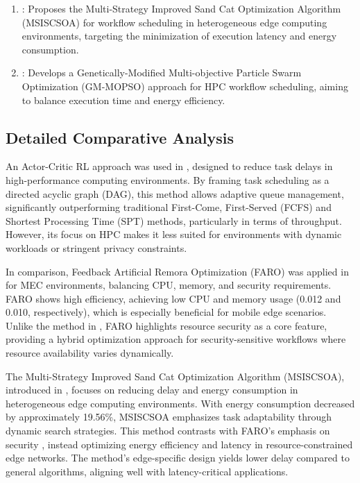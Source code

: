\documentclass[a4paper, final]{article}
\begin{document}
\begin{enumerate}
\item \cite{bib:3_sandcat}: Proposes the Multi-Strategy Improved Sand Cat Optimization Algorithm 
(MSISCSOA) for workflow scheduling in heterogeneous edge computing environments, targeting the 
minimization of execution latency and energy consumption.

\item  \cite{bib:10}: Develops a Genetically-Modified Multi-objective Particle Swarm Optimization 
(GM-MOPSO) approach for HPC workflow scheduling, aiming to balance execution time and energy efficiency.
\end{enumerate}

\subsection{Detailed Comparative Analysis}
An Actor-Critic RL approach was used in \cite{bib:1_acrl}, designed to reduce task delays in high-performance 
computing environments. By framing task scheduling as a directed acyclic graph (DAG), this method allows 
adaptive queue management, significantly outperforming traditional First-Come, First-Served (FCFS) and 
Shortest Processing Time (SPT) methods, particularly in terms of throughput. However, its focus on HPC makes 
it less suited for environments with dynamic workloads or stringent privacy constraints.

In comparison, Feedback Artificial Remora Optimization (FARO) was applied in \cite{bib:2_faro} for MEC 
environments, balancing CPU, memory, and security requirements. FARO shows high efficiency, achieving low 
CPU and memory usage (0.012 and 0.010, respectively), which is especially beneficial for mobile edge scenarios.
Unlike the method in \cite{bib:1_acrl}, FARO highlights resource security as a core feature, providing a 
hybrid optimization approach for security-sensitive workflows where resource availability varies dynamically.

The Multi-Strategy Improved Sand Cat Optimization Algorithm (MSISCSOA), introduced in \cite{bib:3_sandcat}, 
focuses on reducing delay and energy consumption in heterogeneous edge computing environments. With energy 
consumption decreased by approximately 19.56\%, MSISCSOA emphasizes task adaptability through dynamic search 
strategies. This method contrasts with FARO’s emphasis on security \cite{bib:2_faro}, instead optimizing 
energy efficiency and latency in resource-constrained edge networks. The method’s edge-specific design yields 
lower delay compared to general algorithms, aligning well with latency-critical applications.
\end{document}
